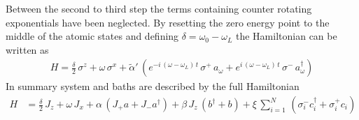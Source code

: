Between the second to third step the terms containing counter rotating exponentials have been neglected. By resetting the zero energy point to the middle of the atomic states and defining $\delta=\omega_0-\omega_L$ the Hamiltonian can be written as
\begin{align*}
    H = \frac{\delta}{2}\,\sigma^z+ \omega\,\sigma^x+\tilde{\alpha}'\,\left( e^{-i\,(\omega-\omega_L)\, t}\,\sigma^+\,a_\omega+e^{i\,(\omega-\omega_L)\, t}\,\sigma^-\,a^\dagger_\omega \right)
\end{align*}
In summary system and baths are described by the full Hamiltonian
\begin{align}
    H &= \frac{\delta}{2}\,J_z+ \omega\,J_x+\alpha\,(J_+a + J_-a^\dagger)+ \beta\,J_z\,(b^\dagger+b)+\xi\,\sum_{i=1}^N\,(\sigma_i^-c_i^\dagger+\sigma_i^+c_i)
\end{align}


